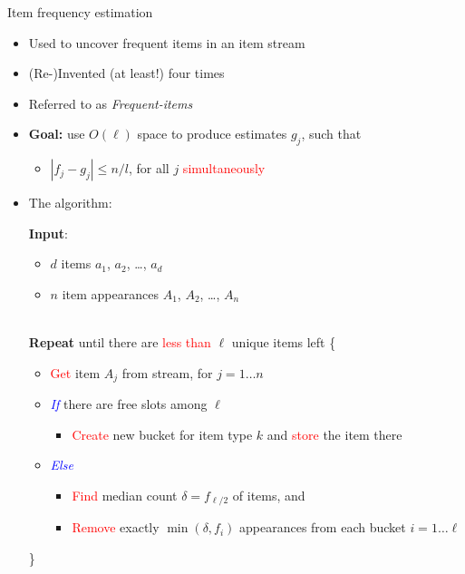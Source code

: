 \documentclass[first=dgreen,second=purple,logo=redque]{aaltoslides}
\begin{document}
\begin{frame}[allowframebreaks=1]{Item frequency estimation}
\begin{itemize}
    \item Used to uncover \textcolor{dgreen}{frequent} items in an item stream
    \item (Re-)Invented (at least!) four times \cite{Misra82, Demaine02, Karp03, Metwally05}
	\item Referred to as \textcolor{dgreen}{\textit{Frequent-items}}
\end{itemize}
\begin{itemize}
	\item \textbf{Goal:} use $O(\ell)$ space to produce estimates $g_{j}$, such
	that
	\begin{itemize}
		\item{$|f_{j} - g_{j} | \leq n/l$}, for all $j$ \textcolor{red}{simultaneously}
	\end{itemize}
\end{itemize}

\framebreak

\begin{itemize}
	\item The algorithm:
	\begin{algorithmic}
		\State \textbf{Input}:\begin{itemize}\item $d$ \textcolor{dgreen}{items} $a_{1}$, $a_{2}$, \ldots,
		$a_{d}$
		\item $n$ \textcolor{dgreen}{item appearances} $A_{1}$, $A_{2}$, \ldots,
		$A_{n}$\end{itemize}
		\\\State \textbf{Repeat} until there are \textcolor{red}{less than}
		$\ell$ \textcolor{dgreen}{unique} items left \{
		\begin{itemize}
			\item \textcolor{red}{Get} item $A_{j}$ from stream, for $j = 1 \ldots n$
		\end{itemize}
		\begin{itemize}
			\item \textcolor{blue}{\textit{If}} there are free slots among $\ell$
			\begin{itemize}\item \textcolor{red}{Create} new bucket for item type $k$ and \textcolor{red}{store} the item there\end{itemize}
			\item \textcolor{blue}{\textit{Else}}
				\begin{itemize}
					\item \textcolor{red}{Find} \textcolor{dgreen}{median} count $\delta = f_{\ell/2}$
					of items, and
					\item \textcolor{red}{Remove} exactly $\min{(\delta, f_{i})}$ appearances from each bucket $i = 1 \ldots \ell$
				\end{itemize}
		\end{itemize}
		\State \}
	\end{algorithmic}
\end{itemize}


\end{frame}
\end{document}
